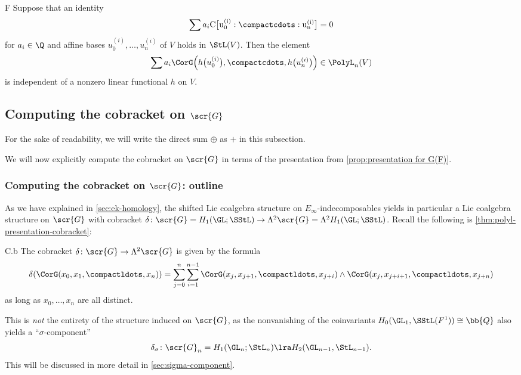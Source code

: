\documentclass[a4paper]{amsart}
\begin{document}
\begin{customthm}{F}
Suppose that an identity 
\[
\sum a_i \rm{C}\bigl[u_0^{(i)}:\compactcdots:u_n^{(i)}\bigr]=0\]
for $a_i\in \Q$ and affine bases $u_0^{(i)},\dots,u_n^{(i)}$ of $V$ holds in $\StL(V)$. Then the element 
\[
\sum a_i \CorG\Bigl(h\bigl(u_0^{(i)}\bigr),\compactcdots, h\bigl(u_n^{(i)}\bigr)\Bigr)\in \PolyL_n(V)
\]
is independent of a nonzero linear functional $h$ on $V$.
\end{customthm}


\subsection{Computing the cobracket on $\scr{G}$}

\begin{notation}For the sake of readability, we will write the direct sum $\oplus$ as $+$ in this subsection.
\end{notation}

We will now explicitly compute the cobracket on $\scr{G}$ in terms of the presentation from \cref{prop:presentation for G(F)}.

\subsubsection{Computing the cobracket on $\scr{G}$: outline} \label{sec:cobracket-outline} As we have explained in \cref{sec:ek-homology}, the shifted Lie coalgebra structure on $E_\infty$-indecomposables yields in particular a Lie coalgebra structure on $\scr{G}$ with cobracket $\delta \colon \scr{G} = H_1(\GL;\SStL) \to \Lambda^2 \scr{G}= \Lambda^2 H_1(\GL;\SStL)$. Recall the following is \cref{thm:polyl-presentation-cobracket}:

\begin{customthm}{C.b} The cobracket $\delta \colon \scr{G} \to \Lambda^2 \scr{G}$ is given by the formula
\[\delta(\CorG(x_0,x_1,\compactldots,x_n)) = \sum_{j=0}^n \sum_{i=1}^{n-1} \CorG(x_j,x_{j+1},\compactldots,x_{j+i}) \wedge \CorG(x_j,x_{j+i+1},\compactldots,x_{j+n})\]
as long as $x_0,\ldots,x_n$ are all distinct.
\end{customthm}

\begin{remark}This is \emph{not} the entirety of the structure induced on $\scr{G}$, as the nonvanishing of the coinvariants $H_0(\GL_1,\SStL(F^1)) \cong \bb{Q}$ also yields a ``$\sigma$-component''
\[\delta_\sigma \colon \scr{G}_n =  H_1(\GL_n;\StL_n) \lra  H_2(\GL_{n-1},\StL_{n-1}).\]
This will be discussed in more detail in \cref{sec:sigma-component}.\end{remark}
\end{document}
